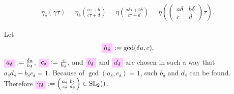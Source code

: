 \documentclass{article}
\begin{document}
\begin{gather*}
\eta_\delta(\gamma\tau)
=
\eta_\delta\left(\frac{a\tau+b}{c\tau+d}\right) =
\eta\left(\frac{a\delta\tau+b\delta}{c\tau+d}\right)
=
\eta\left(\begin{pmatrix}a\delta&b\delta\\c&d\end{pmatrix}
  \tau\right).
\end{gather*}

Let
%
\begin{gather}
  \defineNotation[h-delta]{h_\delta}
  :=
  \gcd(\delta a,c), \label{eq:h_delta}
\end{gather}
%
$\defineNotation[a-delta]{a_\delta}:=\frac{\delta a}{h_\delta}$,
%
$\defineNotation[c-delta]{c_\delta}:=\frac{c}{h_\delta}$,
%
and $\defineNotation[b-delta]{b_\delta}$ and
$\defineNotation[d-delta]{d_\delta}$ are chosen in such a way that
$a_\delta d_\delta - b_\delta c_\delta = 1$.
%
Because of $\gcd(a_\delta, c_\delta)=1$, such $b_\delta$ and $d_\delta$
can be found.
%
Therefore
  $\defineNotation[gamma-delta]{\gamma_\delta} := \left(
  \begin{smallmatrix}a_\delta&b_\delta\\c_\delta&d_\delta\end{smallmatrix}
\right)\in \SL2Z$.
\end{document}

